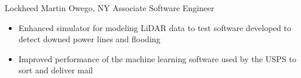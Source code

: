 
        {Lockheed Martin}
        {Owego, NY}
        {Associate Software Engineer}
        {}{
    \begin{itemize}
        \item Enhanced simulator for modeling LiDAR data to test software developed to detect
            downed power lines and flooding
        \item Improved performance of the machine learning software used by the USPS to sort and deliver mail
    \end{itemize}
}
